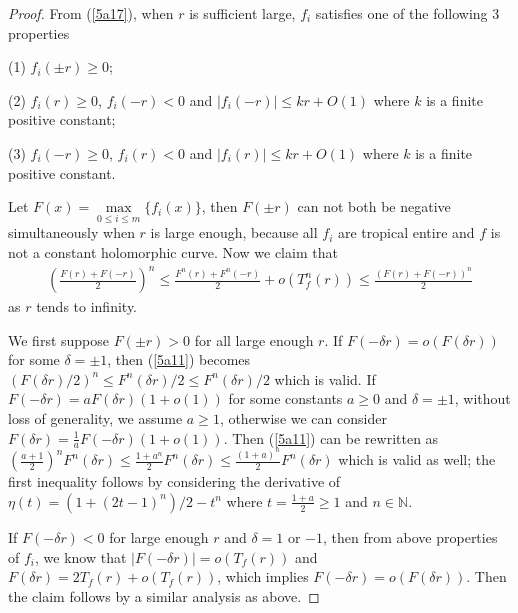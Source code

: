 \documentclass[10pt,a4paper]{amsart}
\begin{document}
\begin{proof}
From (\ref{5a17}), when $r$ is sufficient large, $f_{i}$ satisfies one of the following 3 properties

(1) $f_{i}(\pm r)\geq 0$;

(2) $f_{i}(r)\geq 0$, $f_{i}(-r)<0$ and $|f_{i}(-r)|\leq kr+O(1)$ where $k$ is a finite positive constant;

(3) $f_{i}(-r)\geq 0$, $f_{i}(r)<0$ and $|f_{i}(r)|\leq kr+O(1)$ where $k$ is a finite positive constant.

    Let $F(x)=\max\limits_{0\leq i\leq m}\{f_{i}(x)\}$, then $F(\pm r)$ can not both be negative simultaneously when $r$ is large enough, because all $f_{i}$ are tropical entire and $f$ is not a constant holomorphic curve. Now we claim that
    \begin{eqnarray}\label{5a11}
        \left(\frac{F(r)+F(-r)}{2}\right)^{n}\leq \frac{F^{n}(r)+F^{n}(-r)}{2}+o(T_{f}^{n}(r))\leq \frac{(F(r)+F(-r))^{n}}{2}
    \end{eqnarray}
    as $r$ tends to infinity. 
    
    We first suppose $F(\pm r)>0$ for all large enough $r$. If $F(-\delta r)=o(F(\delta r))$ for some $\delta=\pm 1$, then (\ref{5a11}) becomes $(F(\delta r)/2)^{n}\leq F^{n}(\delta r)/2\leq F^{n}(\delta r)/2$ which is valid. If $F(-\delta r)= a F(\delta r)(1+o(1))$ for some constants $a\geq 0$ and $\delta=\pm 1$, without loss of generality, we assume $a\geq 1$, otherwise we can consider $F(\delta r)= \frac{1}{a}F(-\delta r)(1+o(1))$. Then (\ref{5a11}) can be rewritten as $\left(\frac{a+1}{2}\right)^{n}F^{n}(\delta r)\leq \frac{1+a^{n}}{2}F^{n}(\delta r)\leq \frac{(1+a)^{n}}{2}F^{n}(\delta r)$ which is valid as well; the first inequality follows by considering the derivative of $\eta(t)=(1+(2t-1)^{n})/2-t^{n}$ where $t=\frac{1+a}{2}\geq 1$ and $n\in\mathbb{N}$.

    If $F(-\delta r)<0$ for large enough $r$ and $\delta=1$ or $-1$, then from above properties of $f_{i}$, we know that $|F(-\delta r)|=o(T_{f}(r))$ and $F(\delta r)=2T_{f}(r)+o(T_{f}(r))$, which implies $F(-\delta r)=o(F(\delta r))$. Then the claim follows by a similar analysis as above.
    

\end{proof}
\end{document}
